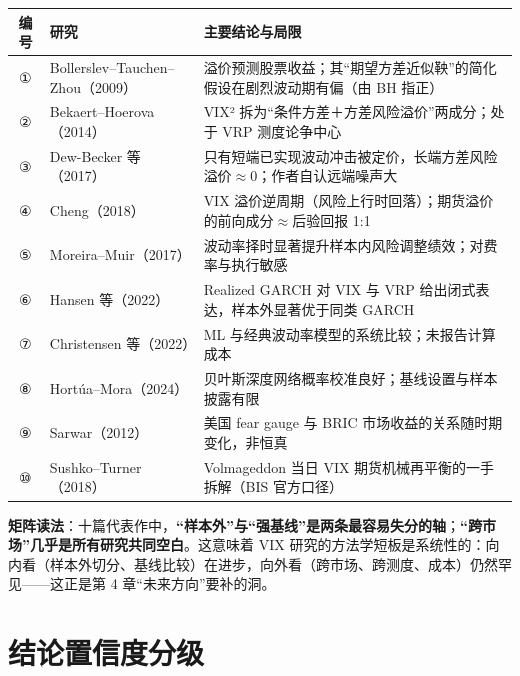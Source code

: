 \documentclass[11pt,a4paper]{article}
\begin{document}
\begin{center}
\small
\renewcommand{\arraystretch}{1.18}
\begin{tabularx}{\textwidth}{@{}c L{0.24\textwidth} X@{}}
\toprule
\textbf{编号} & \textbf{研究} & \textbf{主要结论与局限} \\
\midrule
① & Bollerslev--Tauchen--Zhou（2009） & 溢价预测股票收益；其“期望方差近似鞅”的简化假设在剧烈波动期有偏（由 BH 指正） \\
② & Bekaert--Hoerova（2014） & VIX² 拆为“条件方差＋方差风险溢价”两成分；处于 VRP 测度论争中心 \\
③ & Dew-Becker 等（2017） & 只有短端已实现波动冲击被定价，长端方差风险溢价$\approx$0；作者自认远端噪声大 \\
④ & Cheng（2018） & VIX 溢价逆周期（风险上行时回落）；期货溢价的前向成分$\approx$后验回报 1:1 \\
⑤ & Moreira--Muir（2017） & 波动率择时显著提升样本内风险调整绩效；对费率与执行敏感 \\
⑥ & Hansen 等（2022） & Realized GARCH 对 VIX 与 VRP 给出闭式表达，样本外显著优于同类 GARCH \\
⑦ & Christensen 等（2022） & ML 与经典波动率模型的系统比较；未报告计算成本 \\
⑧ & Hortúa--Mora（2024） & 贝叶斯深度网络概率校准良好；基线设置与样本披露有限 \\
⑨ & Sarwar（2012） & 美国 fear gauge 与 BRIC 市场收益的关系随时期变化，非恒真 \\
⑩ & Sushko--Turner（2018） & Volmageddon 当日 VIX 期货机械再平衡的一手拆解（BIS 官方口径） \\
\bottomrule
\end{tabularx}
\end{center}

\noindent\textbf{矩阵读法}：十篇代表作中，\textbf{“样本外”与“强基线”是两条最容易失分的轴}；\textbf{“跨市场”几乎是所有研究共同空白}。这意味着 VIX 研究的方法学短板是系统性的：向内看（样本外切分、基线比较）在进步，向外看（跨市场、跨测度、成本）仍然罕见——这正是第 4 章“未来方向”要补的洞。

\newpage
\section{结论置信度分级}
\end{document}
